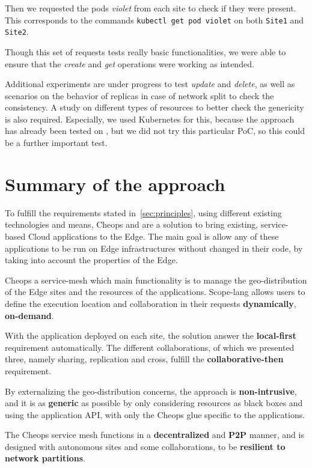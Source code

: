 Then we requested the pods \emph{violet} from each site to check if
they were present.
%
This corresponds to the commands \verb|kubectl get pod violet| on both
\verb|Site1| and \verb|Site2|.

%
Though this set of requests tests really basic functionalities, we
were able to ensure that the \emph{create} and \emph{get} operations
were working as intended.
%

Additional experiments are under progress to test \emph{update} and
\emph{delete}, as well as scenarios on the behavior of replicas in
case of network split to check the consistency.
%
A study on different types of resources to better check the genericity
is also required.
%
Especially, we used Kubernetes for this, because the approach has
already been tested on \os, but we did not try this particular
\acrshort{PoC}, so this could be a further important test.


\chapter*{Summary of the approach}
\label{chap:summary-cheops}


To fulfill the requirements stated in~\autoref{sec:principles}, using
different existing technologies and means, Cheops and \scl are a
solution to bring existing, service-based Cloud applications to the
Edge.
%
The main goal is allow any of these applications to be run on Edge
infrastructures without changed in their code, by taking into account
the properties of the Edge.


Cheops a service-mesh which main functionality is to manage the
geo-distribution of the Edge sites and the resources of the
applications.
%
Scope-lang allows users to define the execution location and
collaboration in their requests \textbf{dynamically},
\textbf{on-demand}.

With the application deployed on each site, the solution answer the
\textbf{local-first} requirement automatically.
%
The different collaborations, of which we presented three, namely
sharing, replication and cross, fulfill the
\textbf{collaborative-then} requirement.

By externalizing the geo-distribution concerns, the approach is
\textbf{non-intrusive}, and it is as \textbf{generic} as possible
by only considering resources as black boxes and using the application
API, with only the Cheops glue specific to the applications.

The Cheops service mesh functions in a \textbf{decentralized} and
\textbf{P2P} manner, and is designed with autonomous sites and some
collaborations, to be \textbf{resilient to network partitions}.
